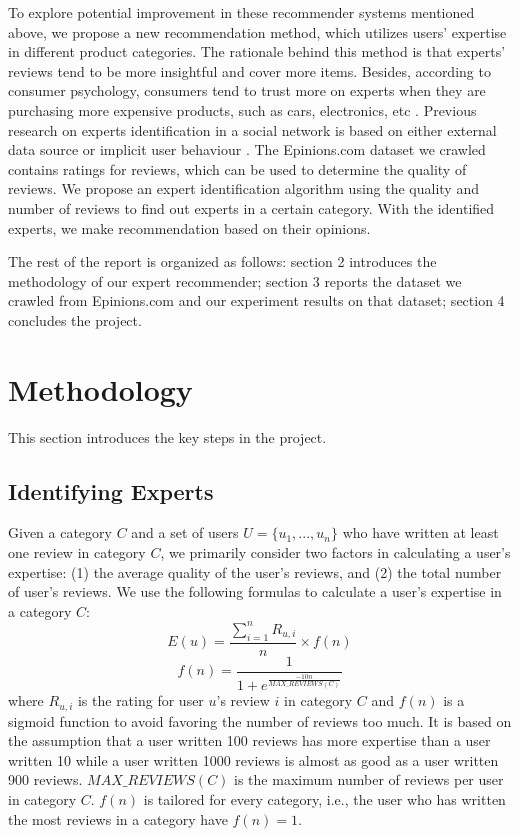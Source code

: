 \documentclass[12pt]{article}
\begin{document}
To explore potential improvement in these recommender systems mentioned above, we propose a new recommendation method, which utilizes users' expertise in different product categories. The rationale behind this method is that experts' reviews tend to be more insightful and cover more items. Besides, according to consumer psychology, consumers tend to trust more on experts when they are purchasing more expensive products, such as cars, electronics, etc \cite{consumer}. Previous research on experts identification in a social network is based on either external data source \cite{Amatriain:2009p101} or implicit user behaviour \cite{Cho:2007p102}. The Epinions.com dataset we crawled contains ratings for reviews, which can be used to determine the quality of reviews. We propose an expert identification algorithm using the quality and number of reviews to find out experts in a certain category. With the identified experts, we make recommendation based on their opinions.

The rest of the report is organized as follows: section 2 introduces the methodology of our expert recommender; section 3 reports the dataset we crawled from Epinions.com and our experiment results on that dataset; section 4 concludes the project. 

\section{Methodology}
This section introduces the key steps in the project. 

\subsection{Identifying Experts} %
\label{sub:identifying_experts}

Given a category $C$ and a set of users $U = \{{u_{1}, ..., u_{n}}\}$ who have written at least one review in category $C$, we primarily consider two factors in calculating a user's expertise: (1) the average quality of the user's reviews, and (2) the total number of user's reviews. We use the following formulas to calculate a user's expertise in a category $C$:
\begin{equation}
E(u) = \frac{\sum_{i=1}^n R_{u, i}} {n} \times f(n)
\end{equation}
\begin{equation}
f(n) = \frac{1}{1 + e^{\frac{-10n} {MAX\_REVIEWS(C)}}}
\end{equation}
where $R_{u, i}$ is the rating for user $u$'s review $i$ in category $C$ and $f(n)$ is a sigmoid function to avoid favoring the number of reviews too much. It is based on the assumption that a user written 100 reviews has more expertise than a user written 10 while a user written 1000 reviews is almost as good as a user written 900 reviews. $MAX\_REVIEWS(C)$ is the maximum number of reviews per user in category $C$. $f(n)$ is tailored for every category, i.e., the user who has written the most reviews in a category have $f(n)=1$.
\end{document}
